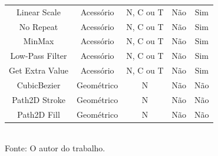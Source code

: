 \documentclass[
	12pt,				%
	openright,			%
	oneside,			%
	a4paper,			%
	english,			%
	brazil				%
	]{abntex2}
\begin{document}
\begin{table}[h]
\begin{tabular}{c|c|c|c|c}
				Linear Scale         & Acessório  & N, C ou T & Não        & Sim \\
				No Repeat            & Acessório  & N, C ou T & Não        & Sim \\
				MinMax               & Acessório  & N, C ou T & Não        & Sim \\
				Low-Pass Filter      & Acessório  & N, C ou T & Não        & Sim \\
				Get Extra Value      & Acessório  & N, C ou T & Não        & Sim \\
				CubicBezier          & Geométrico & N                                         & Não        & Não \\
				Path2D Stroke        & Geométrico & N                                         & Não        & Não \\
				Path2D Fill          & Geométrico & N                                         & Não        & Não \\
			\end{tabular}
			\bigskip
			\\
			\footnotesize Fonte: O autor do trabalho.
		\end{table}

		


			
\end{document}
